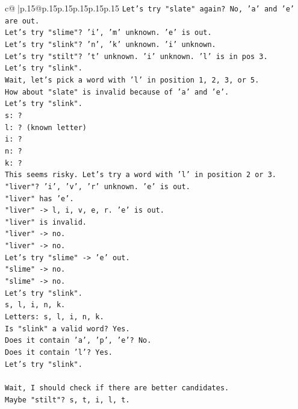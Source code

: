 \documentclass{article}
\begin{document}
{\begin{supertabular}{c@{$\;$}|p{.15\linewidth}@{}p{.15\linewidth}p{.15\linewidth}p{.15\linewidth}p{.15\linewidth}p{.15\linewidth}}
{{{\texttt{Let's try "slate" again? No, 'a' and 'e' are out.} \\
\texttt{Let's try "slime"? 'i', 'm' unknown. 'e' is out.} \\
\texttt{Let's try "slink"? 'n', 'k' unknown. 'i' unknown.} \\
\texttt{Let's try "stilt"? 't' unknown. 'i' unknown. 'l' is in pos 3.} \\
\texttt{Let's try "slink".} \\
\texttt{Wait, let's pick a word with 'l' in position 1, 2, 3, or 5.} \\
\texttt{How about "slate" is invalid because of 'a' and 'e'.} \\
\texttt{Let's try "slink".} \\
\texttt{s: ?} \\
\texttt{l: ? (known letter)} \\
\texttt{i: ?} \\
\texttt{n: ?} \\
\texttt{k: ?} \\
\texttt{This seems risky. Let's try a word with 'l' in position 2 or 3.} \\
\texttt{"liver"? 'i', 'v', 'r' unknown. 'e' is out.} \\
\texttt{"liver" has 'e'.} \\
\texttt{"liver" {-}> l, i, v, e, r. 'e' is out.} \\
\texttt{"liver" is invalid.} \\
\texttt{"liver" {-}> no.} \\
\texttt{"liver" {-}> no.} \\
\texttt{Let's try "slime" {-}> 'e' out.} \\
\texttt{"slime" {-}> no.} \\
\texttt{"slime" {-}> no.} \\
\texttt{Let's try "slink".} \\
\texttt{s, l, i, n, k.} \\
\texttt{Letters: s, l, i, n, k.} \\
\texttt{Is "slink" a valid word? Yes.} \\
\texttt{Does it contain 'a', 'p', 'e'? No.} \\
\texttt{Does it contain 'l'? Yes.} \\
\texttt{Let's try "slink".} \\
\\ 
\texttt{Wait, I should check if there are better candidates.} \\
\texttt{Maybe "stilt"? s, t, i, l, t.} \\
}}}
\end{supertabular}}
\end{document}
